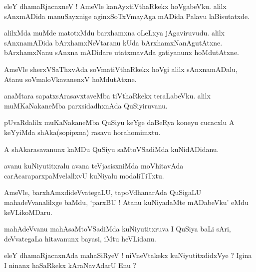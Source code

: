 \documentclass{article}
\begin{document}

\begin{mn}
eleY dhamaRjacnxneV ! AmeVle kanAyxtiVthaRkekx  hoVgabeVku. alilx sAnxmADida manuSayxnige 
aginxSoTxVmayAga mADida Palavu laBisutatxde.
\end{mn}

\begin{mn}
alilxMda muMde matotxMdu barxhamxna oLeLxya jAgaviruvudu. alilx sAnxnamADida bArxhamxNeVtaranu kUda
bArxhamxNanAgutAtxne. bArxhamxNanu sAnxna mADidare utatxmavAda gatiyanunx hoMdutAtxne.
\end{mn}

\begin{mn}
AmeVle sherxVSaThxvAda soVmatiVthaRkekx hoVgi alilx sAnxnamADalu, Atanu soVmaloVkavanenxV 
hoMdutAtxne.
\end{mn}

\begin{mn}
anaMtara sapatxsArasavxtaveMba tiVthaRkekx teraLabeVku. alilx muMKaNakaneMba parxsidadhxnAda  
QuSiyiruvanu.
\end{mn}

\begin{mn}
pUvaRdalilx muKaNakaneMba QuSiyu keYge daBeRya koneyu cucacxlu A keYyiMda shAka(sopipxna) rasavu
horahomimxtu.
\end{mn}

\begin{mn}
A shAkarasavanunx kaMDu QuSiyu saMtoVSadiMda kuNidADidanu.
\end{mn}

\begin{mn}
avanu kuNiyutitxralu avana teVjasisxniMda moVhitavAda carAcaraparxpaMvelallxvU kuNiyalu 
modaliTiTxtu.
\end{mn}

\begin{mn}
AmeVle, barxhAmxdideVvategaLU, tapoVdhanarAda QuSigaLU mahadeVvanalilxge baMdu, `parxBU ! Atanu 
kuNiyadaMte mADabeVku' eMdu keVLikoMDaru.
\end{mn}

\begin{mn}
mahAdeVvanu mahAsaMtoVSadiMda kuNiyutitxruva I QuSiya baLi sAri, deVvategaLa hitavanunx bayasi, 
iMtu heVLidanu.
\end{mn}

\begin{mn}
eleY dhamaRjacnxnAda mahaSiRyeV ! niVneVtakekx kuNiyutitxdidxVye ? Igina I ninanx haSaRkekx 
kAraNavAdarU Enu ?
\end{mn}
\end{document}
